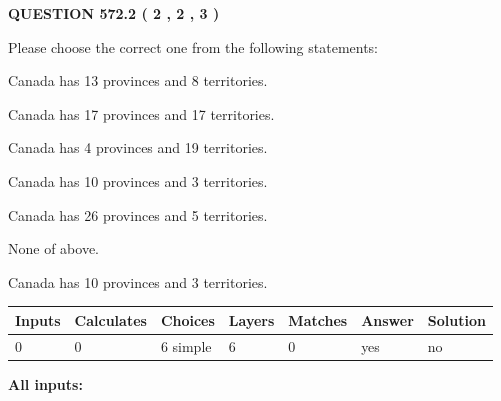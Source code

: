 \documentclass[12pt]{article}
\begin{document}
   
  
\vspace{0.2in}
  
{\textbf{\Large{QUESTION
572.2 
 ( 2 , 2 , 3 )
}}}
  
  
Please choose the correct one from the following statements:
 
 
Canada has  13 provinces and  8 territories.
 
 
Canada has  17 provinces and  17 territories.
 
 
Canada has   4 provinces and  19 territories.
 
 
Canada has 10  provinces and 3 territories.
 
 
Canada has  26 provinces and  5 territories.
 
 
 None of above.
 
 
\noindent{}
 
 
Canada has 10  provinces and 3 territories.
 
 
\noindent{}
 
 
   
   
   
   
\noindent\begin{tabular}{|l|l|l|l|l|l|l|}
 \hline
Inputs & Calculates & Choices & Layers & Matches & Answer & Solution \\ \hline
 0  & 
 0  & 
 6
  simple  
  & 
 6  & 
 0  & 
  yes & 
  no 
  \\ \hline
 \end{tabular}
   
   
   
   
\noindent{}
   
   
   
   
\noindent\vspace{0.1in}\hspace{-0.08in} {\textbf{\Large{All inputs: }}}
   
   
   
   
   
   
 \vspace{0.2in}
 
\end{document}
